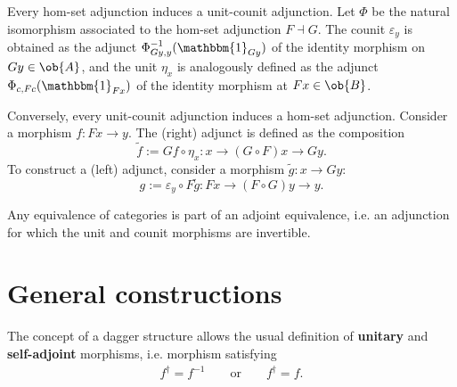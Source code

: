     \begin{property}
        Every hom-set adjunction induces a unit-counit adjunction. Let $\Phi$ be the natural isomorphism associated to the hom-set adjunction $F\dashv G$. The counit $\varepsilon_y$ is obtained as the adjunct $\Phi^{-1}_{Gy,y}(\mathbbm{1}_{Gy})$ of the identity morphism on $Gy\in\ob{A}$, and the unit $\eta_x$ is analogously defined as the adjunct $\Phi_{c,Fc}(\mathbbm{1}_{Fx})$ of the identity morphism at $Fx\in\ob{B}$.

        Conversely, every unit-counit adjunction induces a hom-set adjunction. Consider a morphism $f:Fx\rightarrow y$. The (right) adjunct is defined as the composition \[\widetilde{f}:=Gf\circ\eta_x:x\rightarrow (G\circ F)x\rightarrow Gy.\] To construct a (left) adjunct, consider a morphism $\widetilde{g}:x\rightarrow Gy$: \[g:=\varepsilon_y\circ F\tilde{g}:Fx\rightarrow(F\circ G)y\rightarrow y.\]
    \end{property}

    \begin{property}
        Any equivalence of categories is part of an adjoint equivalence, i.e. an adjunction for which the unit and counit morphisms are invertible.
    \end{property}

\section{General constructions}

    \begin{remark}
        The concept of a dagger structure allows the usual definition of \textbf{unitary} and \textbf{self-adjoint} morphisms, i.e. morphism satisfying
        \begin{gather}
            f^\dagger = f^{-1}\qquad\text{or}\qquad f^\dagger = f.
        \end{gather}
    \end{remark}

